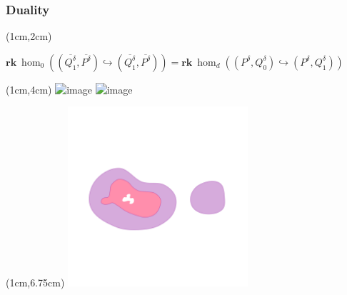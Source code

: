\begin{frame}
  \frametitle{Duality}

  \begin{textblock*}{11cm}(1cm,2cm)
    \begin{small}
      $\mathbf{rk}~\hom_0((\overline{Q_1^\delta}, \overline{P^\delta})\hookrightarrow(\overline{Q_1^\delta}, \overline{P^\delta})) = \mathbf{rk}~\hom_d((P^\delta, Q_0^\delta)\hookrightarrow (P^\delta, Q_1^\delta))$

    \end{small}
  \end{textblock*}

  \begin{textblock*}{6cm}(1cm,4cm)
    \centering
    \includegraphics<1>[trim=50 250 50 300, clip, width=0.5\textwidth]{figures/ass1_2/PQ2comp}%
    \includegraphics<2>[trim=50 250 50 300, clip, width=0.5\textwidth]{figures/ass1_2/PQ2comp-spread}%
  \end{textblock*}
  \begin{textblock*}{6cm}(1cm,6.75cm)
    \centering
    \includegraphics[trim=50 250 50 300, clip, width=0.5\textwidth]{figures/ass1_2/PQ2}%
  \end{textblock*}


\end{frame}
